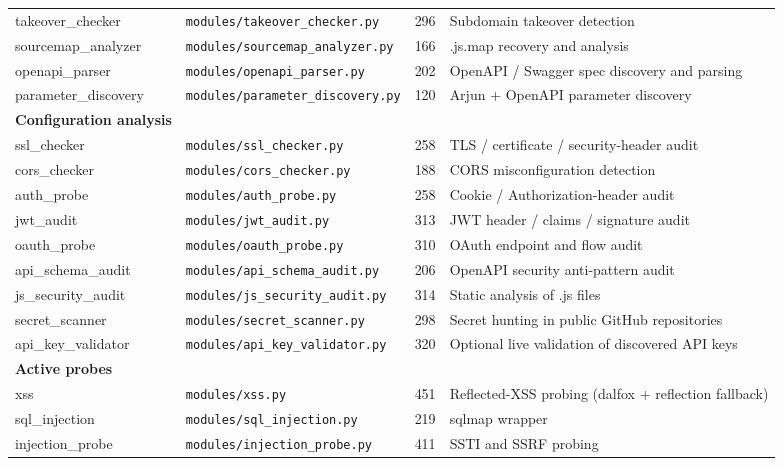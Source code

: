\begin{longtable}{|l|l|r|p{5.6cm}|}
takeover\_checker       & \texttt{modules/takeover\_checker.py}      &  296 & Subdomain takeover detection \\
sourcemap\_analyzer     & \texttt{modules/sourcemap\_analyzer.py}    &  166 & .js.map recovery and analysis \\
openapi\_parser         & \texttt{modules/openapi\_parser.py}        &  202 & OpenAPI / Swagger spec discovery and parsing \\
parameter\_discovery    & \texttt{modules/parameter\_discovery.py}   &  120 & Arjun + OpenAPI parameter discovery \\
\hline
\textbf{Configuration analysis} & & & \\
ssl\_checker            & \texttt{modules/ssl\_checker.py}           &  258 & TLS / certificate / security-header audit \\
cors\_checker           & \texttt{modules/cors\_checker.py}          &  188 & CORS misconfiguration detection \\
auth\_probe             & \texttt{modules/auth\_probe.py}            &  258 & Cookie / Authorization-header audit \\
jwt\_audit              & \texttt{modules/jwt\_audit.py}             &  313 & JWT header / claims / signature audit \\
oauth\_probe            & \texttt{modules/oauth\_probe.py}           &  310 & OAuth endpoint and flow audit \\
api\_schema\_audit      & \texttt{modules/api\_schema\_audit.py}     &  206 & OpenAPI security anti-pattern audit \\
js\_security\_audit     & \texttt{modules/js\_security\_audit.py}    &  314 & Static analysis of .js files \\
secret\_scanner         & \texttt{modules/secret\_scanner.py}        &  298 & Secret hunting in public GitHub repositories \\
api\_key\_validator     & \texttt{modules/api\_key\_validator.py}    &  320 & Optional live validation of discovered API keys \\
\hline
\textbf{Active probes} & & & \\
xss                     & \texttt{modules/xss.py}                    &  451 & Reflected-XSS probing (dalfox + reflection fallback) \\
sql\_injection          & \texttt{modules/sql\_injection.py}         &  219 & sqlmap wrapper \\
injection\_probe        & \texttt{modules/injection\_probe.py}       &  411 & SSTI and SSRF probing \\

\end{longtable}
